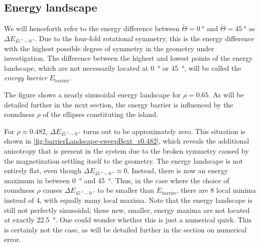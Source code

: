 \documentclass[11pt,a4paper,english,twoside]{article}
\begin{document}
\subsection{Energy landscape}
We will henceforth refer to the energy difference between $\widetilde{\Theta} = \SI{0}{\degree}$ and $\widetilde{\Theta} = \SI{45}{\degree}$ as $\Delta E_{\SI{45}{\degree}-\SI{0}{\degree}}$. Due to the four-fold rotational symmetry, this is the energy difference with the highest possible degree of symmetry in the geometry under investigation. The difference between the highest and lowest points of the energy landscape, which are not necessarily located at \SI{0}{\degree} or \SI{45}{\degree}, will be called the \textit{energy barrier} $E_\mathrm{barrier}$. \par
The figure shows a nearly sinusoidal energy landscape for $\rho=0.65$. As will be detailed further in the next section, the energy barrier is influenced by the roundness $\rho$ of the ellipses constituting the island. \par
For $\rho \approx 0.482$, $\Delta E_{\SI{45}{\degree}-\SI{0}{\degree}}$ turns out to be approximately zero. This situation is shown in \cref{fig:barrierLandscape-sweepBext_r0.482}, which reveals the additional anisotropy that is present in the system due to the broken symmetry caused by the magnetization settling itself to the geometry. The energy landscape is not entirely flat, even though $\Delta E_{\SI{45}{\degree}-\SI{0}{\degree}} \approx 0$. Instead, there is now an energy maximum in between \SI{0}{\degree} and \SI{45}{\degree}. Thus, in the case where the choice of roundness $\rho$ causes $\Delta E_{\SI{45}{\degree}-\SI{0}{\degree}}$ to be smaller than $E_{\mathrm{barrier}}$, there are 8 local minima instead of 4, with equally many local maxima. Note that the energy landscape is still not perfectly sinusoidal; these new, smaller, energy maxima are not located at exactly \SI{22.5}{\degree}. One could wonder whether this is just a numerical quirk. This is certainly not the case, as will be detailed further in the section on numerical error.
\end{document}
